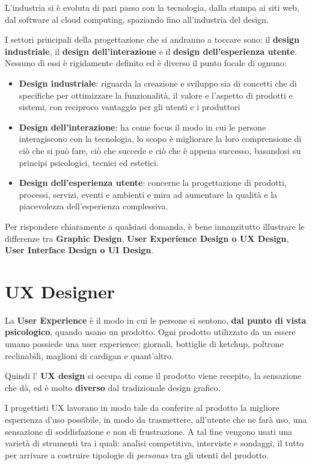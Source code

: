 \documentclass[a4paper,11pt,oneside]{book}
\begin{document}
L'industria si è evoluta di pari passo con la tecnologia, dalla stampa ai siti web, dal software al cloud computing, spaziando fino all'industria del design.

I settori principali della progettazione che si andranno a toccare sono: il \textbf{design industriale}, il \textbf{design dell'interazione} e il \textbf{design dell'esperienza utente}. Nessuno di essi è rigidamente definito ed è diverso il punto focale di ognuno:

\begin{itemize}
	\item \textbf{Design industriale}: riguarda la creazione e sviluppo sia di concetti che di specifiche per ottimizzare la funzionalità, il valore e l'aspetto di prodotti e sistemi, con reciproco vantaggio per gli utenti e i produttori
	\item \textbf{Design dell'interazione}: ha come focus il modo in cui le persone interagiscono con la tecnologia, lo scopo è migliorare la loro comprensione di ciò che si può fare, ciò che succede e ciò che è appena successo, basandosi su principi psicologici, tecnici ed estetici.
	      \pagebreak
	\item \textbf{Design dell'esperienza utente}: concerne la progettazione di prodotti, processi, servizi, eventi e ambienti e mira ad aumentare la qualità e la piacevolezza dell'esperienza complessiva.
\end{itemize}

Per rispondere chiaramente a qualsiasi domanda, è bene innanzitutto illustrare le differenze tra \textbf{Graphic Design}, \textbf{User Experience Design o UX Design}, \textbf{User Interface Design o UI Design}.

\section{UX Designer}
La \textbf{User Experience} è il modo in cui le persone si sentono, \textbf{dal punto di vista psicologico}, quando usano un prodotto. Ogni prodotto utilizzato da un essere umano possiede una user experience: giornali, bottiglie di ketchup, poltrone reclinabili, maglioni di cardigan e quant'altro.

Quindi l' \textbf{UX design} si occupa di come il prodotto viene recepito, la sensazione che dà, ed è molto \textbf{diverso} dal tradizionale design grafico.

I progettisti UX lavorano in modo tale da conferire al prodotto la migliore esperienza d'uso possibile, in modo da trasmettere, all'utente che ne farà uso, una sensazione di soddisfazione e non di frustrazione.
A tal fine vengono usati una varietà di strumenti tra i quali: analisi competitiva, interviste e sondaggi, il tutto per arrivare a costruire tipologie di \textit{personas} tra gli utenti del prodotto.
\end{document}
